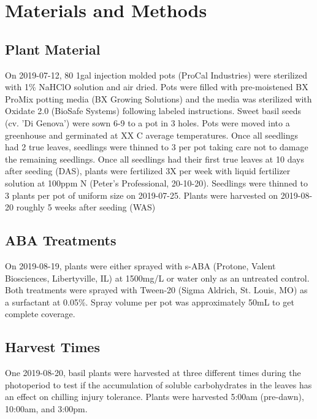 \documentclass{article}\usepackage[]{graphicx}\usepackage[]{color}
\begin{document}
\section{Materials and Methods}
\subsection{Plant Material}
On 2019-07-12, 80 1gal injection molded pots (ProCal Industries) were sterilized with 1\% NaHClO solution and air dried. Pots were filled with pre-moistened BX ProMix potting media (BX Growing Solutions) and the media was sterilized with Oxidate 2.0 (BioSafe Systems) following labeled instructions. Sweet basil seeds (cv. 'Di Genova') were sown 6-9 to a pot in 3 holes. Pots were moved into a greenhouse and germinated at XX C average temperatures. Once all seedlings had 2 true leaves, seedlings were thinned to 3 per pot taking care not to damage the remaining seedlings. Once all seedlings had their first true leaves at 10 days after seeding (DAS), plants were fertilized 3X per week with liquid fertilizer solution at 100ppm N (Peter's Professional, 20-10-20). Seedlings were thinned to 3 plants per pot of uniform size on 2019-07-25. Plants were harvested on 2019-08-20 roughly 5 weeks after seeding (WAS)

\subsection{ABA Treatments}
On 2019-08-19, plants were either sprayed with s-ABA (Protone, Valent Biosciences, Libertyville, IL) at 1500mg/L or water only as an untreated control. Both treatments were sprayed with Tween-20 (Sigma Aldrich, St. Louis, MO) as a surfactant at 0.05\%. Spray volume per pot was approximately 50mL to get complete coverage. 

\subsection{Harvest Times}
One 2019-08-20, basil plants were harvested at three different times during the photoperiod to test if the accumulation of soluble carbohydrates in the leaves has an effect on chilling injury tolerance. Plants were harvested 5:00am (pre-dawn), 10:00am, and 3:00pm.
\end{document}
